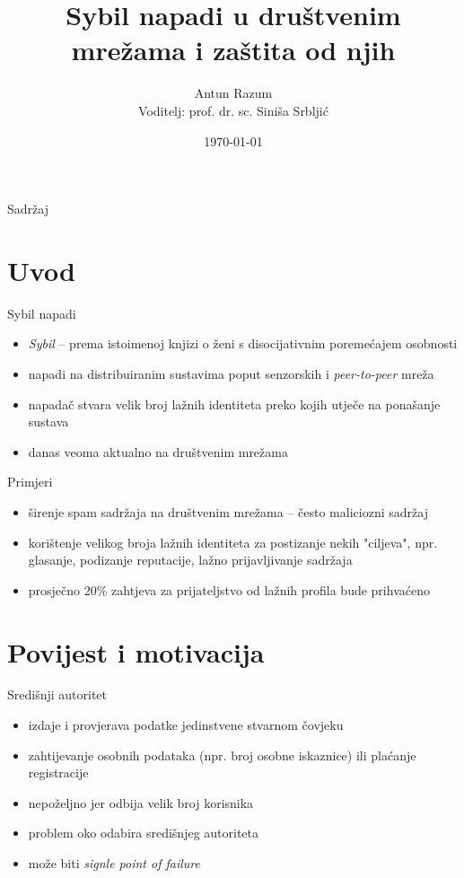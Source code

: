 \documentclass{beamer}
\title{Sybil napadi u društvenim mrežama i zaštita od njih}
\author{Antun Razum\\Voditelj: prof. dr. sc. Siniša Srbljić}
\institute{Fakultet elektrotehnike i računarstva}
\date{\today}
\begin{document}
\maketitle

\begin{frame}{Sadržaj}
  \tableofcontents
\end{frame}

\section{Uvod}

\begin{frame}{Sybil napadi}
  \begin{itemize}
    \item \textit{Sybil} -- prema istoimenoj knjizi o ženi s disocijativnim poremećajem osobnosti
    \item napadi na distribuiranim sustavima poput senzorskih i \textit{peer-to-peer} mreža
    \item napadač stvara velik broj lažnih identiteta preko kojih utječe na ponašanje sustava
    \item danas veoma aktualno na društvenim mrežama
  \end{itemize}
\end{frame}

\begin{frame}{Primjeri}
  \begin{itemize}
    \item širenje spam sadržaja na društvenim mrežama -- često maliciozni sadržaj
    \item korištenje velikog broja lažnih identiteta za postizanje nekih "ciljeva", npr. glasanje, podizanje reputacije, lažno prijavljivanje sadržaja
    \item prosječno 20\% zahtjeva za prijateljstvo od lažnih profila bude prihvaćeno
  \end{itemize}
\end{frame}

\section{Povijest i motivacija}

\begin{frame}{Središnji autoritet}
  \begin{itemize}
    \item izdaje i provjerava podatke jedinstvene stvarnom čovjeku
    \item zahtijevanje osobnih podataka (npr. broj osobne iskaznice) ili plaćanje registracije
    \item nepoželjno jer odbija velik broj korisnika
    \item problem oko odabira središnjeg autoriteta
    \item može biti \textit{signle point of failure}
  \end{itemize}
\end{frame}
\end{document}
